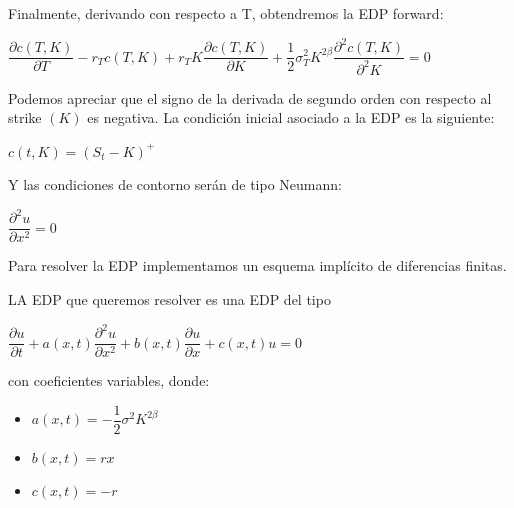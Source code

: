 \documentclass[titlepage, 10pt,]{article}
\begin{document}
Finalmente, derivando con respecto a T, obtendremos la EDP forward:

\begin{center}
	$\dfrac{\partial c(T, K)}{\partial T} - r_{T} c(T, K) + r_{T}K \dfrac{\partial c(T, K)}{\partial K} + \dfrac{1}{2} \sigma_{T}^{2}K^{2 \beta} \dfrac{\partial^{2}c(T, K)}{\partial^{2}K} = 0$
\end{center}

Podemos apreciar que el signo de la derivada de segundo orden con respecto al strike $(K)$ es negativa. La condición inicial asociado a la EDP es la siguiente:

\begin{center}
	$c(t, K) = (S_{t} - K)^{+}$
\end{center}

Y las condiciones de contorno serán de tipo Neumann:

\begin{center}
	$\dfrac{\partial^{2}u}{\partial{x}^{2}} = 0$
\end{center}

Para resolver la EDP implementamos un esquema implícito de diferencias finitas. 




LA EDP que queremos resolver es una EDP del tipo

\begin{center}
	$\dfrac{\partial u}{\partial t} + a(x, t) \dfrac{\partial^{2}u}{\partial{x}^{2}} + b(x, t) \dfrac{\partial u}{\partial x} + c(x, t) u = 0$
\end{center}

con coeficientes variables, donde:

\begin{itemize}
	\item[] $a(x, t) = -\dfrac{1}{2} \sigma^{2} K^{2\beta}$ 
	\item[] $b(x, t) = rx$
	\item[] $c(x, t) = -r$	
\end{itemize}
\end{document}

